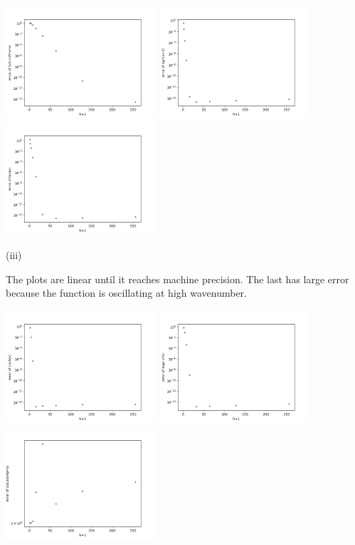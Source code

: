 \documentclass[10pt]{article}
\begin{document}
\includegraphics[width=2.2in]{p2dii1.png}
\includegraphics[width=2.2in]{p2dii2.png}
\includegraphics[width=2.2in]{p2dii3.png}

(iii)

The plots are linear until it reaches machine precision. The last has large error because the function is oscillating at high wavenumber.

\includegraphics[width=2.2in]{p2diii1.png}
\includegraphics[width=2.2in]{p2diii2.png}
\includegraphics[width=2.2in]{p2diii3.png}
\end{document}
